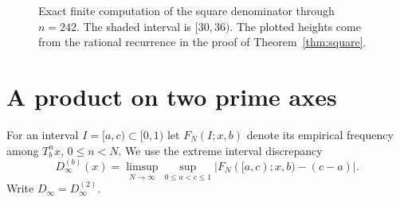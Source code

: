 \documentclass[11pt]{article}
\begin{document}
\begin{figure}[ht]
\centering
\caption{Exact finite computation of the square denominator through $n=242$.
The shaded interval is $[30,36)$. The plotted heights come from the rational
recurrence in the proof of Theorem~\ref{thm:square}.}
\end{figure}

\section{A product on two prime axes}\label{sec:mixed}

For an interval $I=[a,c)\subset[0,1)$ let $F_N(I;x,b)$ denote its empirical frequency
among $T_b^n x$, $0\le n<N$. We use the extreme interval discrepancy
\[
 D_\infty^{(b)}(x)=\limsup_{N\to\infty}\sup_{0\le a<c\le1}
          |F_N([a,c);x,b)-(c-a)|.
\]
Write $D_\infty=D_\infty^{(2)}$.
\end{document}
